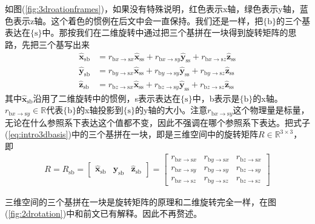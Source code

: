 \documentclass[12pt, a4paper, article, UTF8]{ctexart}
\begin{document}
如图(\ref{fig:3droationframes})，如果没有特殊说明，红色表示x轴，绿色表示y轴，蓝色表示z轴。这个着色的惯例在后文中会一直保持。我们还是一样，把$\{\text{b}\}$的三个基表达在$\{\text{s}\}$中。那按我们在二维旋转中通过把三个基拼在一块得到旋转矩阵的思路，先把三个基写出来
\begin{align}
\hat{\mathbf{x}}_\text{sb} &= r_{\text{b}x\rightarrow\text{s}x} \hat{\mathbf{x}}_\text{ss} + r_{\text{b}x\rightarrow\text{s}y}\hat{\mathbf{y}}_\text{ss} + r_{\text{b}x\rightarrow\text{s}z}\hat{\mathbf{z}}_\text{ss}\nonumber\\  
\hat{\mathbf{y}}_\text{sb} &= r_{\text{b}y\rightarrow\text{s}x}\hat{\mathbf{x}}_\text{ss} + r_{\text{b}y\rightarrow\text{s}y}\hat{\mathbf{y}}_\text{ss} + r_{\text{b}y\rightarrow\text{s}z}\hat{\mathbf{z}}_\text{ss}\nonumber\\  
\hat{\mathbf{z}}_\text{sb} &= r_{\text{b}z\rightarrow\text{s}x}\hat{\mathbf{x}}_\text{ss} + r_{\text{b}z\rightarrow\text{s}y}\hat{\mathbf{y}}_\text{ss} + r_{\text{b}z\rightarrow\text{s}z}\hat{\mathbf{z}}_\text{ss} \label{eq:intro3dbasis}
\end{align}
其中$\hat{\mathbf{x}}_\text{sb}$沿用了二维旋转中的惯例，s表示表达在$\{\text{s}\}$中，b表示是$\{\text{b}\}$的x轴。$r_{\text{b}x\rightarrow\text{s}y}\in\mathbb{R}$代表$\{\text{b}\}$的x轴投影到$\{\text{s}\}$的y轴的大小。注意$r_{\text{b}x\rightarrow\text{s}y}$这个物理量是标量，无论在什么参照系下表达这个值都不变，因此不强调在哪个参照系下表达。把式子(\ref{eq:intro3dbasis})中的三个基拼在一块，即是三维空间中的旋转矩阵$R\in \mathbb{R}^{3\times 3}$，即
\begin{align}
R = R_\text{sb} = 
\begin{bmatrix}
\hat{\mathbf{x}}_\text{sb} & \hat{\mathbf{y}}_\text{sb} &\hat{\mathbf{z}}_\text{sb}
\end{bmatrix}
=
\begin{bmatrix}
r_{\text{b}x\rightarrow\text{s}x} & r_{\text{b}y\rightarrow\text{s}x} & r_{\text{b}z\rightarrow\text{s}x}\\
r_{\text{b}x\rightarrow\text{s}y} & r_{\text{b}y\rightarrow\text{s}y} & r_{\text{b}z\rightarrow\text{s}y}\\
r_{\text{b}x\rightarrow\text{s}z} & r_{\text{b}y\rightarrow\text{s}z} & r_{\text{b}z\rightarrow\text{s}z}
\end{bmatrix}
\end{align}

三维空间的三个基拼在一块是旋转矩阵的原理和二维旋转完全一样，在图(\ref{fig:2drotation})中和前文已有解释。因此不再赘述。
\end{document}
